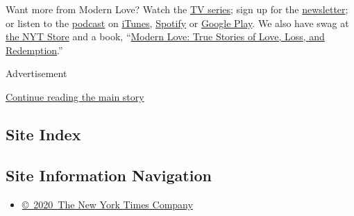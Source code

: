 Want more from Modern Love? Watch the
\href{https://www.nytimes3xbfgragh.onion/2019/09/12/style/modern-love-tv-show-trailer.html}{TV
series}; sign up for the
\href{https://www.nytimes3xbfgragh.onion/newsletters/love-letter}{newsletter};
or listen to the
\href{https://www.nytimes3xbfgragh.onion/column/modern-love-podcast}{podcast}
on
\href{https://itunes.apple.com/us/podcast/modern-love/id1065559535?mt=2\&version=meter+at+0\&module=meter-Links\&pgtype=article\&contentId=\&mediaId=\&referrer=\&priority=true\&action=click\&contentCollection=meter-links-click}{iTunes},
\href{https://open.spotify.com/show/03Er7mSPq9IEewOgbPD3vO}{Spotify} or
\href{https://play.google.com/music/listen?u=0\#/ps/Iktqjbkz7bychbnofblw32dik64}{Google
Play}. We also have swag at
\href{https://store.nytimes3xbfgragh.onion/collections/modern-love}{the
NYT Store} and a book,
``\href{https://www.penguinrandomhouse.com/books/623036/modern-love-revised-and-updated-by-edited-by-daniel-jones-with-contributions-by-andrew-rannells-ayelet-waldman-amy-krouse-rosenthal-veronica-chambers-and-more/}{Modern
Love: True Stories of Love, Loss, and Redemption}.''

Advertisement

\protect\hyperlink{after-bottom}{Continue reading the main story}

\hypertarget{site-index}{%
\subsection{Site Index}\label{site-index}}

\hypertarget{site-information-navigation}{%
\subsection{Site Information
Navigation}\label{site-information-navigation}}

\begin{itemize}
\tightlist
\item
  \href{https://help.nytimes3xbfgragh.onion/hc/en-us/articles/115014792127-Copyright-notice}{©~2020~The
  New York Times Company}
\end{itemize}

